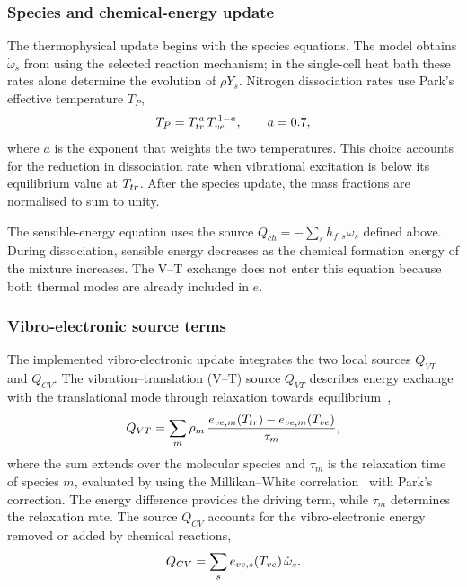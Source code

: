 \subsubsection{Species and chemical-energy update}
\label{sec:implementato-specie}
\label{sec:implementato-energia}

The thermophysical update begins with the species equations. The model
obtains $\dot\omega_s$ from \mpp{} using the selected reaction mechanism;
in the single-cell heat bath these rates alone determine the evolution of
$\rho Y_s$. Nitrogen dissociation rates use Park's effective temperature $T_P$,
\begin{equation}
  T_P = T_{tr}^{\,a}\,T_{ve}^{\,1-a}, \qquad a = 0.7 ,
\end{equation}
where $a$ is the exponent that weights the two temperatures. This choice
accounts for the reduction in dissociation rate when vibrational
excitation is below its equilibrium value at $T_{tr}$. After the species
update, the mass fractions are normalised to sum to unity.

The sensible-energy equation uses the source
$Q_{ch}=-\sum_s h_{f,s}\dot\omega_s$ defined above. During dissociation,
sensible energy decreases as the chemical formation energy of the mixture
increases. The V--T exchange does not enter this equation because both
thermal modes are already included in $e$.

\subsubsection{Vibro-electronic source terms}
\label{sec:implementato-eve}

The implemented vibro-electronic update integrates the two local sources
$Q_{VT}$ and $Q_{CV}$.
The vibration--translation (V--T) source $Q_{VT}$ describes energy exchange
with the translational mode through relaxation towards
equilibrium~\cite{landau1936},
\begin{equation}
  Q_{VT} = \sum_m \rho_m\,
  \frac{e_{ve,m}(T_{tr}) - e_{ve,m}(T_{ve})}{\tau_m} ,
\end{equation}
where the sum extends over the molecular species and $\tau_m$ is the
relaxation time of species $m$, evaluated by \mpp{} using the Millikan--White
correlation~\cite{millikan1963} with Park's correction. The energy difference
provides the driving term, while $\tau_m$ determines the relaxation rate.
The source $Q_{CV}$ accounts for the vibro-electronic energy removed or added
by chemical reactions,
\begin{equation}
  Q_{CV} = \sum_s e_{ve,s}(T_{ve})\,\dot\omega_s .
\end{equation}
